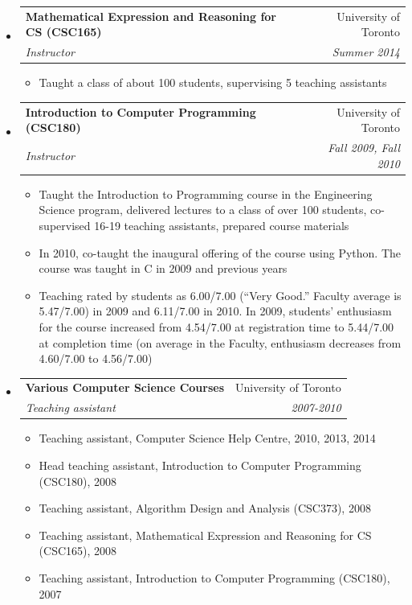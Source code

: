 \documentclass[letterpaper,11pt]{article}
\makeatletter
\newcommand{\resitem}[1]{\item #1 \vspace{-2pt}}
\newcommand{\ressubheading}[4]{
\begin{tabular*}{\linewidth}[t]{l@{\extracolsep{\fill}}r}
		\textbf{#1} & #2 \\
		\textit{\textcolor{accent}{#3}} & \textit{#4} \\
\end{tabular*}\vspace{-2pt}}
\makeatother
\begin{document}
\begin{itemize}
\item
	\ressubheading{Mathematical Expression and Reasoning for CS (CSC165)}{University of Toronto}{Instructor}{Summer 2014}
	\begin{itemize}
		\resitem{Taught a class of about 100 students, supervising 5 teaching assistants}
	\end{itemize}

\item
	\ressubheading{Introduction to Computer Programming (CSC180)}{University of Toronto}{Instructor}{Fall 2009, Fall 2010}
	\begin{itemize}
		\resitem{Taught the Introduction to Programming course in the Engineering Science program, delivered lectures to a class of over 100 students, co-supervised 16-19 teaching assistants, prepared course materials}
		\resitem{In 2010, co-taught the inaugural offering of the course using Python. The course was taught in C in 2009 and previous years}
		\resitem{Teaching rated by students as 6.00/7.00 (``Very Good.'' Faculty average is 5.47/7.00) in 2009 and 6.11/7.00 in 2010. In 2009, students' enthusiasm for the course increased from 4.54/7.00 at registration time to 5.44/7.00 at completion time (on average in the Faculty, enthusiasm decreases from 4.60/7.00 to 4.56/7.00)}
	\end{itemize}


\item 
	\ressubheading{Various Computer Science Courses}{University of Toronto}{Teaching assistant}{2007-2010}
	\begin{itemize}
		\resitem{Teaching assistant, Computer Science Help Centre, 2010, 2013, 2014}		
		\resitem{Head teaching assistant, Introduction to Computer Programming (CSC180), 2008}
		\resitem{Teaching assistant, Algorithm Design and Analysis (CSC373), 2008}
		\resitem{Teaching assistant, Mathematical Expression and Reasoning for CS (CSC165), 2008}
		\resitem{Teaching assistant, Introduction to Computer Programming (CSC180), 2007}
	\end{itemize}

\end{itemize}
\end{document}
